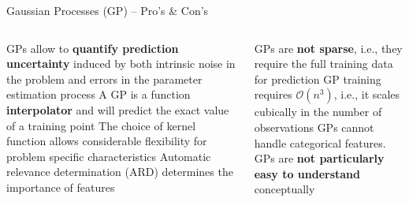 \begin{frame}{Gaussian Processes (GP) -- Pro's \& Con's}

\begin{columns}[onlytextwidth]
  \begin{column}{0.5\textwidth}
    \footnotesize
    \begin{itemize}
      \positem GPs allow to \textbf{quantify prediction uncertainty} induced by both intrinsic noise in the problem and errors in the parameter estimation process
      \positem A GP is a function \textbf{interpolator} and will predict the exact value of a training point
      \positem The choice of kernel function allows considerable flexibility for problem specific characteristics
      \positem Automatic relevance determination (ARD) determines the importance of features
    \end{itemize}
  \end{column}
  \begin{column}{0.5\textwidth}
    \footnotesize
    \begin{itemize}
      \negitem GPs are \textbf{not sparse}, i.e., they require the full training data for prediction
      \negitem GP training requires $\mathcal{O}(n^3)$, i.e., it scales cubically in the number of observations
      \negitem GPs cannot handle categorical features.
      \negitem GPs are \textbf{not particularly easy to understand} conceptually
    \end{itemize}
  \end{column}
\end{columns}

\vfill

\small


\end{frame}
